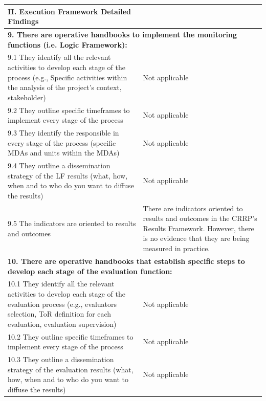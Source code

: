 \documentclass[
  10pt,
]{book}
\begin{document}
\begin{table}
\centering
\begin{tabular}[t]{l|l}
\hline
II. Execution Framework Detailed Findings &  \\
\hline
\multicolumn{2}{l}{\textbf{9. There are operative handbooks to implement the monitoring functions (i.e. Logic Framework):}}\\
\hline
\hspace{1em}9.1 They identify all the relevant activities to develop each stage of the process (e.g., Specific activities within the analysis of the project's context, stakeholder) & Not applicable\\
\hline
\hspace{1em}9.2 They outline specific timeframes to implement every stage of the process & Not applicable\\
\hline
\hspace{1em}9.3 They identify the responsible in every stage of the process (specific MDAs and units within the MDAs) & Not applicable\\
\hline
\hspace{1em}9.4 They outline a dissemination strategy of the LF results (what, how, when and to who do you want to diffuse the results) & Not applicable\\
\hline
\hspace{1em}9.5 The indicators are oriented to results and outcomes & There are indicators oriented to results and outcomes in the CRRP’s Results Framework. However, there is no evidence that they are being measured in practice.\\
\hline
\multicolumn{2}{l}{\textbf{10. There are operative handbooks that establish specific steps to develop each stage of the evaluation function:}}\\
\hline
\hspace{1em}10.1 They identify all the relevant activities to develop each stage of the evaluation process (e.g., evaluators selection, ToR definition for each evaluation, evaluation supervision) & Not applicable\\
\hline
\hspace{1em}10.2 They outline specific timeframes to implement every stage of the process & Not applicable\\
\hline
\hspace{1em}10.3 They outline a dissemination strategy of the evaluation results (what, how, when and to who do you want to diffuse the results) & Not applicable\\

\end{tabular}
\end{table}
\end{document}
